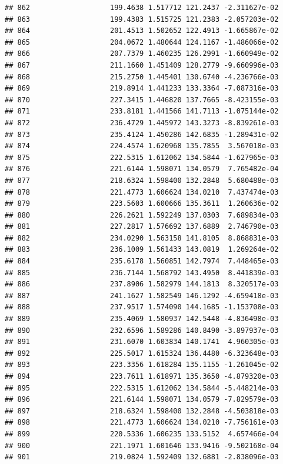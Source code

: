 \documentclass[
]{article}
\begin{document}
\begin{verbatim}
## 862                   199.4638 1.517712 121.2437 -2.311627e-02
## 863                   199.4383 1.515725 121.2383 -2.057203e-02
## 864                   201.4513 1.502652 122.4913 -1.665867e-02
## 865                   204.0672 1.480644 124.1167 -1.486066e-02
## 866                   207.7379 1.460235 126.2991 -1.660949e-02
## 867                   211.1660 1.451409 128.2779 -9.660996e-03
## 868                   215.2750 1.445401 130.6740 -4.236766e-03
## 869                   219.8914 1.441233 133.3364 -7.087316e-03
## 870                   227.3415 1.446820 137.7665 -8.423155e-03
## 871                   233.8181 1.441566 141.7113 -1.075144e-02
## 872                   236.4729 1.445972 143.3273 -8.839261e-03
## 873                   235.4124 1.450286 142.6835 -1.289431e-02
## 874                   224.4574 1.620968 135.7855  3.567018e-03
## 875                   222.5315 1.612062 134.5844 -1.627965e-03
## 876                   221.6144 1.598071 134.0579  7.765482e-04
## 877                   218.6324 1.598400 132.2848  5.680488e-03
## 878                   221.4773 1.606624 134.0210  7.437474e-03
## 879                   223.5603 1.600666 135.3611  1.260636e-02
## 880                   226.2621 1.592249 137.0303  7.689834e-03
## 881                   227.2817 1.576692 137.6889  2.746790e-03
## 882                   234.0290 1.563158 141.8105  8.868831e-03
## 883                   236.1009 1.561433 143.0819  1.269264e-02
## 884                   235.6178 1.560851 142.7974  7.448465e-03
## 885                   236.7144 1.568792 143.4950  8.441839e-03
## 886                   237.8906 1.582979 144.1813  8.320517e-03
## 887                   241.1627 1.582549 146.1292 -4.659418e-03
## 888                   237.9517 1.574090 144.1685 -1.153708e-03
## 889                   235.4069 1.580937 142.5448 -4.836498e-03
## 890                   232.6596 1.589286 140.8490 -3.897937e-03
## 891                   231.6070 1.603834 140.1741  4.960305e-03
## 892                   225.5017 1.615324 136.4480 -6.323648e-03
## 893                   223.3356 1.618284 135.1155 -1.261045e-02
## 894                   223.7611 1.618971 135.3650 -4.879320e-03
## 895                   222.5315 1.612062 134.5844 -5.448214e-03
## 896                   221.6144 1.598071 134.0579 -7.829579e-03
## 897                   218.6324 1.598400 132.2848 -4.503818e-03
## 898                   221.4773 1.606624 134.0210 -7.756161e-03
## 899                   220.5336 1.606235 133.5152  4.657466e-04
## 900                   221.1971 1.601646 133.9416 -9.502168e-04
## 901                   219.0824 1.592409 132.6881 -2.838096e-03

\end{verbatim}
\end{document}
